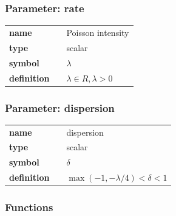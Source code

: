\subsubsection*{Parameter: rate}

\noindent\begin{tabular}{p{2cm}cl}
\textbf{name} & & Poisson intensity \\
\textbf{type} & & scalar \\
\textbf{symbol} & & $\lambda$  \\
\textbf{definition} & & $\lambda \in R, \lambda > 0$
\end{tabular}
\subsubsection*{Parameter: dispersion}

\noindent\begin{tabular}{p{2cm}cl}
\textbf{name} & & dispersion \\
\textbf{type} & & scalar \\
\textbf{symbol} & & $\delta$  \\
\textbf{definition} & & $\max(-1,-\lambda/4) < \delta < 1$
\end{tabular}
\subsubsection*{Functions}


